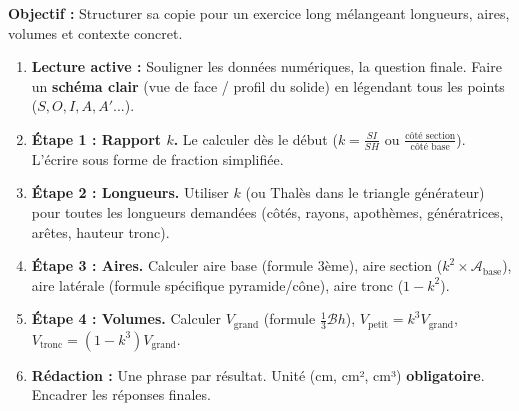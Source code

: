 \documentclass[11pt]{article}
\begin{document}
\begin{methode}
    \textbf{Objectif :} Structurer sa copie pour un exercice long mélangeant longueurs, aires, volumes et contexte concret.
    \begin{enumerate}
        \item \textbf{Lecture active :} Souligner les données numériques, la question finale. Faire un \textbf{schéma clair} (vue de face / profil du solide) en légendant tous les points ($S, O, I, A, A'...$).
        \item \textbf{Étape 1 : Rapport $k$.} Le calculer dès le début ($k = \frac{SI}{SH}$ ou $\frac{\text{côté section}}{\text{côté base}}$). L'écrire sous forme de fraction simplifiée.
        \item \textbf{Étape 2 : Longueurs.} Utiliser $k$ (ou Thalès dans le triangle générateur) pour toutes les longueurs demandées (côtés, rayons, apothèmes, génératrices, arêtes, hauteur tronc).
        \item \textbf{Étape 3 : Aires.} Calculer aire base (formule 3ème), aire section ($k^2 \times \mathcal{A}_{\text{base}}$), aire latérale (formule spécifique pyramide/cône), aire tronc ($1-k^2$).
        \item \textbf{Étape 4 : Volumes.} Calculer $V_{\text{grand}}$ (formule $\frac{1}{3}\mathcal{B}h$), $V_{\text{petit}} = k^3 V_{\text{grand}}$, $V_{\text{tronc}} = (1-k^3)V_{\text{grand}}$.
        \item \textbf{Rédaction :} Une phrase par résultat. Unité (cm, cm², cm³) \textbf{obligatoire}. Encadrer les réponses finales.
    \end{enumerate}
\end{methode}
\end{document}
